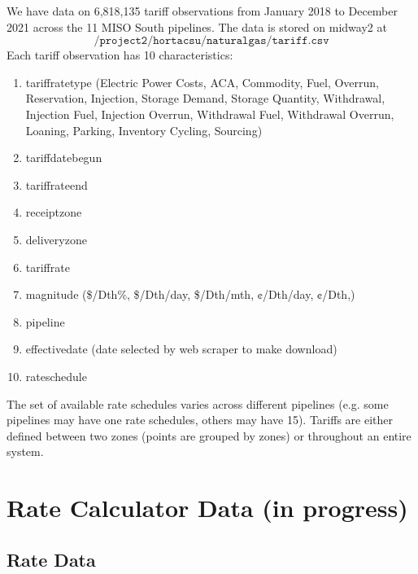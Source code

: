 \documentclass{article}
\newcommand{\1}{\mathbbm{1}}
\newcommand{\us}{\textunderscore}
\theoremstyle{definition}
\begin{document}
We have data on 6,818,135 tariff observations from January 2018 to December 2021 across the 11 MISO South pipelines. The data is stored on midway2 at
$$\texttt{/project2/hortacsu/naturalgas/tariff.csv}$$
Each tariff observation has 10 characteristics:
\begin{enumerate}
\item tariff\us rate\us type (Electric Power Costs,
ACA,
Commodity,
Fuel,
Overrun,
Reservation,
Injection,
Storage Demand,
Storage Quantity,
Withdrawal,
Injection Fuel,
Injection Overrun,
Withdrawal Fuel,
Withdrawal Overrun,
Loaning,
Parking,
Inventory Cycling,
Sourcing)
\item tariff\us date\us begun
\item tariff\us rate\us end
\item receipt\us zone
\item delivery\us zone
\item tariff\us rate
\item magnitude (\$/Dth\%,
\$/Dth/day,
\$/Dth/mth,
¢/Dth/day,
¢/Dth,)
\item pipeline
\item effective\us date (date selected by web scraper to make download)
\item rate\us schedule
\end{enumerate}
The set of available rate schedules varies across different pipelines (e.g. some pipelines may have one rate schedules, others may have 15). Tariffs are either defined between two zones (points are grouped by zones) or throughout an entire system.

\section{Rate Calculator Data (in progress)}

\subsection{Rate Data}
\end{document}
